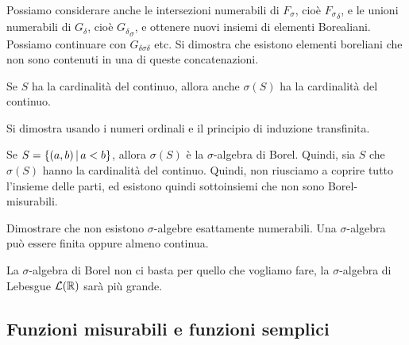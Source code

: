 \documentclass[a4paper]{article}
\begin{document}
\begin{radioactive}
Possiamo considerare anche le intersezioni numerabili di \(F_\sigma\),
cioè \({F_{\sigma}}_\delta\),
e le unioni numerabili di \(G_\delta\), cioè \({G_{\delta}}_{\sigma}\),
e ottenere nuovi insiemi di elementi Borealiani.
Possiamo continuare con \(G_{\delta\sigma\delta}\) etc.
Si dimostra che esistono elementi boreliani che non sono contenuti in
una di queste concatenazioni.
\end{radioactive}

\begin{radioactive}
\begin{snippetproposition}{}
    Se \(S\) ha la cardinalità del continuo, allora anche \(\sigma(S)\)
    ha la cardinalità del continuo.
\end{snippetproposition}
\end{radioactive}

\begin{radioactive}
\begin{snippetproof}{}
    Si dimostra usando i numeri ordinali e il principio di induzione transfinita.
\end{snippetproof}
\end{radioactive}

\begin{radioactive}
Se \(S = \{(a,b) \,|\, a<b\}\), allora \(\sigma(S)\)
è la \(\sigma\)-algebra di Borel.
Quindi, sia \(S\) che \(\sigma(S)\) hanno la cardinalità del continuo.
Quindi, non riusciamo a coprire tutto l'insieme delle parti, ed esistono quindi
sottoinsiemi che non sono Borel-misurabili.
\end{radioactive}

\begin{radioactive}
\begin{snippetexercise}{}
    Dimostrare che non esistono \(\sigma\)-algebre esattamente numerabili.
    Una \(\sigma\)-algebra può essere finita oppure almeno continua.
\end{snippetexercise}
\end{radioactive}

\begin{radioactive}
La \(\sigma\)-algebra di Borel non ci basta per quello che vogliamo fare,
la \(\sigma\)-algebra di Lebesgue \(\mathcal L(\mathbb{R})\) sarà più grande.
\end{radioactive}

\subsection{Funzioni misurabili e funzioni semplici}
\end{document}
